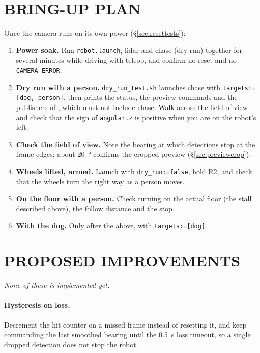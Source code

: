 \section{BRING-UP PLAN}
\label{sec:chaseplan}

Once the camera runs on its own power (\S\ref{sec:resettests}):
\begin{enumerate}
\item \textbf{Power soak.} Run \texttt{robot.launch}, lidar and chase (dry
  run) together for several minutes while driving with teleop, and confirm no
  reset and no \texttt{CAMERA\_ERROR}.
\item \textbf{Dry run with a person.} \texttt{dry\_run\_test.sh} launches chase
  with \texttt{targets:=[dog, person]}, then prints the status, the preview
  commands and the publishers of , which must not include
  chase. Walk across the field of view and check that the sign of
  \texttt{angular.z} is positive when you are on the robot's left.
\item \textbf{Check the field of view.} Note the bearing at which detections
  stop at the frame edges; about \SI{20}{\degree} confirms the cropped preview
  (\S\ref{sec:previewcrop}).
\item \textbf{Wheels lifted, armed.} Launch with \texttt{dry\_run:=false},
  hold R2, and check that the wheels turn the right way as a person moves.
\item \textbf{On the floor with a person.} Check turning on the actual floor
  (the stall described above), the follow distance and the stop.
\item \textbf{With the dog.} Only after the above, with \texttt{targets:=[dog]}.
\end{enumerate}

\section{PROPOSED IMPROVEMENTS}
\label{sec:chasefuture}

\emph{None of these is implemented yet.}

\paragraph{Hysteresis on loss.} Decrement the hit counter on a missed frame
instead of resetting it, and keep commanding the last smoothed bearing until
the \SI{0.5}{s} loss timeout, so a single dropped detection does not stop the
robot.

